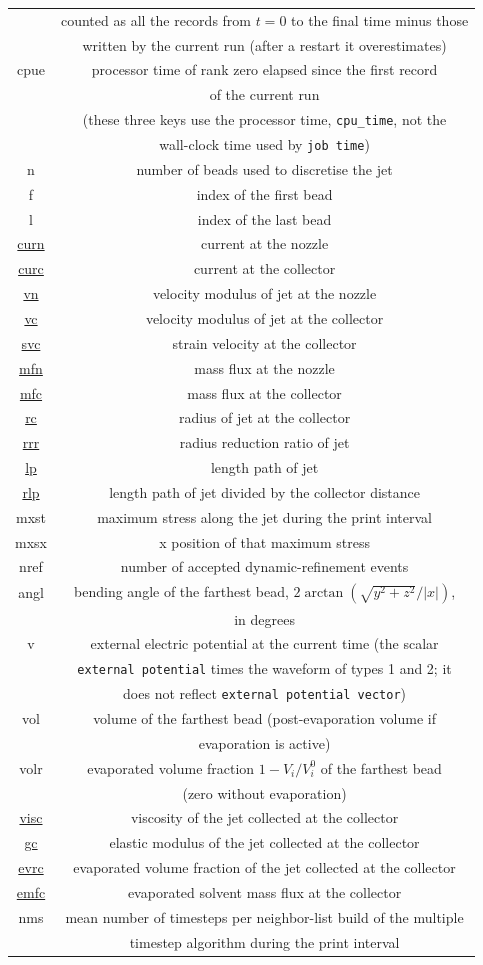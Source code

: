 \begin{longtable}{cc}
 & \quad{}counted as all the records from $t=0$ to the final time minus those\tabularnewline
 & \quad{}written by the current run (after a restart it overestimates)\tabularnewline
cpue  & processor time of rank zero elapsed since the first record\tabularnewline
 & \quad{}of the current run\tabularnewline
 & \quad{}(these three keys use the processor time, \texttt{cpu\_time}, not the\tabularnewline
 & \quad{}wall-clock time used by \texttt{job time})\tabularnewline
n  & number of beads used to discretise the jet\tabularnewline
f  & index of the first bead \tabularnewline
l  & index of the last bead \tabularnewline
\uline{curn}  & current at the nozzle \tabularnewline
\uline{curc}  & current at the collector \tabularnewline
\uline{vn}  & velocity modulus of jet at the nozzle \tabularnewline
\uline{vc}  & velocity modulus of jet at the collector\tabularnewline
\uline{svc}  & strain velocity at the collector \tabularnewline
\uline{mfn}  & mass flux at the nozzle \tabularnewline
\uline{mfc}  & mass flux at the collector \tabularnewline
\uline{rc}  & radius of jet at the collector \tabularnewline
\uline{rrr}  & radius reduction ratio of jet \tabularnewline
\uline{lp}  & length path of jet \tabularnewline
\uline{rlp}  & length path of jet divided by the collector distance\tabularnewline
mxst  & maximum stress along the jet during the print interval\tabularnewline
mxsx  & x position of that maximum stress\tabularnewline
nref  & number of accepted dynamic-refinement events\tabularnewline
angl  & bending angle of the farthest bead, $2\arctan\left(\sqrt{y^{2}+z^{2}}/|x|\right)$,\tabularnewline
 & \quad{}in degrees\tabularnewline
v  & external electric potential at the current time (the scalar\tabularnewline
 & \quad{}\texttt{external potential} times the waveform of types 1 and 2; it\tabularnewline
 & \quad{}does not reflect \texttt{external potential vector})\tabularnewline
vol  & volume of the farthest bead (post-evaporation volume if\tabularnewline
 & \quad{}evaporation is active)\tabularnewline
volr  & evaporated volume fraction $1-V_{i}/V_{i}^{0}$ of the farthest bead\tabularnewline
 & \quad{}(zero without evaporation)\tabularnewline
\uline{visc}  & viscosity of the jet collected at the collector\tabularnewline
\uline{gc}  & elastic modulus of the jet collected at the collector\tabularnewline
\uline{evrc}  & evaporated volume fraction of the jet collected at the collector\tabularnewline
\uline{emfc}  & evaporated solvent mass flux at the collector\tabularnewline
nms  & mean number of timesteps per neighbor-list build of the multiple\tabularnewline
 & \quad{}timestep algorithm during the print interval\tabularnewline

\end{longtable}
